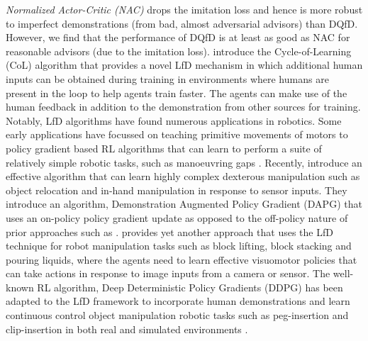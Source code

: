 \documentclass[jair, twoside,11pt,theapa]{article}
\begin{document}
\textit{Normalized Actor-Critic (NAC)} \citep{jing2020reinforcement} drops the imitation loss and hence is more robust to imperfect demonstrations (from bad, almost adversarial advisors) than DQfD. However, we find that the performance of DQfD is at least as good as NAC for reasonable advisors (due to the imitation loss). \citet{goecks2019integrating} introduce the Cycle-of-Learning (CoL) algorithm that provides a novel LfD mechanism in which additional human inputs can be obtained during training in environments where humans are present in the loop to help agents train faster. The agents can make use of the human feedback in addition to the demonstration from other sources for training. Notably, LfD algorithms have found numerous applications in robotics. Some early applications have focussed on teaching primitive movements of motors to policy gradient based RL algorithms that can learn to perform a suite of relatively simple robotic tasks, such as manoeuvring gaps  \citep{peters2008reinforcement, theodorou2010reinforcement}. Recently, \citet{rajeswaran2017learning} introduce an effective algorithm that can learn highly complex dexterous manipulation such as object relocation and in-hand manipulation in response to sensor inputs. They introduce an algorithm, Demonstration Augmented Policy Gradient (DAPG) that uses an on-policy policy gradient \citep{richard1999policy} update as opposed to the off-policy nature of prior approaches such as \citet{hester2018deep}. \citet{zhu2018reinforcement} provides yet another approach that uses the LfD technique for robot manipulation tasks such as block lifting, block stacking and pouring liquids, where the agents need to learn effective visuomotor policies that can take actions in response to image inputs from a camera or sensor. The well-known RL algorithm, Deep Deterministic Policy Gradients (DDPG) \citep{lillicrap2015continuous} has been adapted to the LfD framework to incorporate human demonstrations and learn continuous control object manipulation robotic tasks such as peg-insertion and clip-insertion in both real and simulated environments \citep{vecerik2017leveraging}.  
\end{document}
